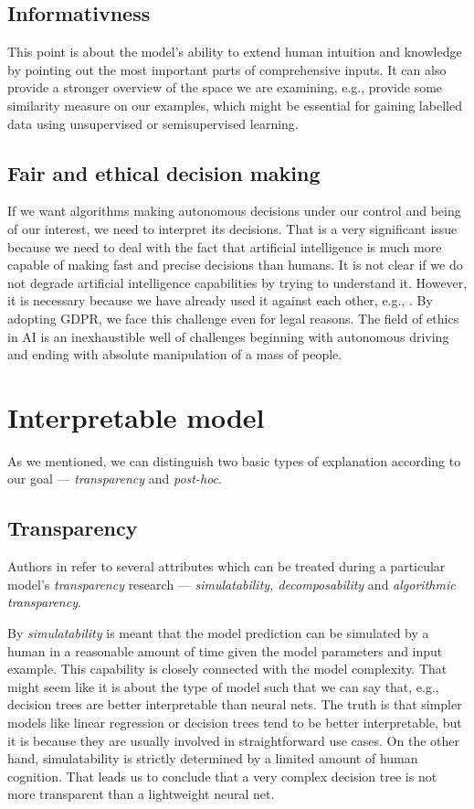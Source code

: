 \subsection{Informativness}
This point is about the model's ability to extend human intuition and knowledge by pointing out the most important parts of comprehensive inputs. It can also provide a stronger overview of the space we are examining, e.g., provide some similarity measure on our examples, which might be essential for gaining labelled data using unsupervised or semisupervised learning.

\subsection{Fair and ethical decision making}
If we want algorithms making autonomous decisions under our control and being of our interest, we need to interpret its decisions. That is a very significant issue because we need to deal with the fact that artificial intelligence is much more capable of making fast and precise decisions than humans. It is not clear if we do not degrade artificial intelligence capabilities by trying to understand it. However, it is necessary because we have already used it against each other, e.g., \cite{Boldyreva2018}. By adopting GDPR, we face this challenge even for legal reasons. The field of ethics in AI \cite{Siau2020} is an inexhaustible well of challenges beginning with autonomous driving and ending with absolute manipulation of a mass of people.

\section{Interpretable model}
As we mentioned, we can distinguish two basic types of explanation according to our goal --- \emph{transparency} and \emph{post-hoc}.

\subsection{Transparency}
Authors in \cite{Lipton2016} refer to several attributes which can be treated during a particular model's \emph{transparency} research --- \emph{simulatability, decomposability} and \emph{algorithmic transparency}.

By \emph{simulatability} is meant that the model prediction can be simulated by a human in a reasonable amount of time given the model parameters and input example. This capability is closely connected with the model complexity. That might seem like it is about the type of model such that we can say that, e.g., decision trees are better interpretable than neural nets. The truth is that simpler models like linear regression or decision trees tend to be better interpretable, but it is because they are usually involved in straightforward use cases. On the other hand, simulatability is strictly determined by a limited amount of human cognition. That leads us to conclude that a very complex decision tree is not more transparent than a lightweight neural net.

